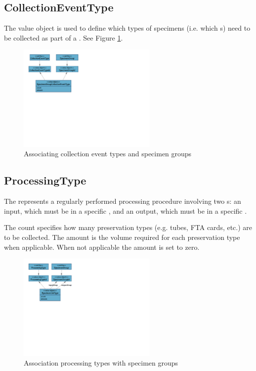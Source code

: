 \subsection{CollectionEventType}
\label{sec:collection-event-type}

The \texttt{\textbf{}} value
object is used to define which types of specimens (i.e. which
s) need to be collected as part of a
. See Figure \ref{fig:collection-event-type}.

\begin{figure}[h]
  \centering
  \includegraphics[trim={9mm 118mm 158mm 9mm}, clip,
    width=0.6\textwidth]{images/collection-event-type}
  \caption{Associating collection event types and specimen groups}
  \label{fig:collection-event-type}
\end{figure}

\subsection{ProcessingType}
\label{sec:Processing-type}

The \texttt{\textbf{}} represents a regularly
performed processing procedure involving two s: an input,
which must be in a specific , and an output, which
must be in a specific .

The count specifies how many preservation types (e.g. tubes, FTA cards, etc.) are to
be collected. The amount is the volume required for each preservation type when
applicable. When not applicable the amount is set to zero.

\begin{figure}[H]
  \centering
  \includegraphics[trim={9mm 120mm 172mm 9mm}, clip,
    width=0.6\textwidth]{images/processing-type}
  \caption{Association processing types with specimen groups}
  \label{fig:processing-type}
\end{figure}

